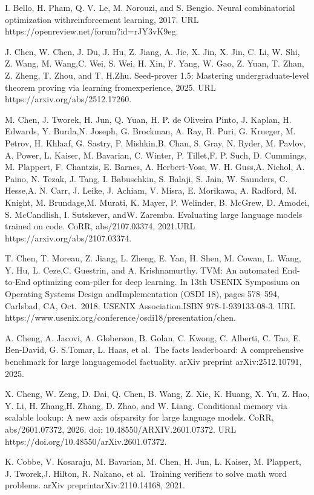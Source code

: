 \documentclass[
  10
]{article}
\begin{document}
I. Bello, H. Pham, Q. V. Le, M. Norouzi, and S. Bengio. Neural
combinatorial optimization withreinforcement learning, 2017. URL
https://openreview.net/forum?id=rJY3vK9eg.

J. Chen, W. Chen, J. Du, J. Hu, Z. Jiang, A. Jie, X. Jin, X. Jin, C. Li,
W. Shi, Z. Wang, M. Wang,C. Wei, S. Wei, H. Xin, F. Yang, W. Gao, Z.
Yuan, T. Zhan, Z. Zheng, T. Zhou, and T. H.Zhu. Seed-prover 1.5:
Mastering undergraduate-level theorem proving via learning
fromexperience, 2025. URL https://arxiv.org/abs/2512.17260.

M. Chen, J. Tworek, H. Jun, Q. Yuan, H. P. de Oliveira Pinto, J. Kaplan,
H. Edwards, Y. Burda,N. Joseph, G. Brockman, A. Ray, R. Puri, G.
Krueger, M. Petrov, H. Khlaaf, G. Sastry, P. Mishkin,B. Chan, S. Gray,
N. Ryder, M. Pavlov, A. Power, L. Kaiser, M. Bavarian, C. Winter, P.
Tillet,F. P. Such, D. Cummings, M. Plappert, F. Chantzis, E. Barnes, A.
Herbert-Voss, W. H. Guss,A. Nichol, A. Paino, N. Tezak, J. Tang, I.
Babuschkin, S. Balaji, S. Jain, W. Saunders, C. Hesse,A. N. Carr, J.
Leike, J. Achiam, V. Misra, E. Morikawa, A. Radford, M. Knight, M.
Brundage,M. Murati, K. Mayer, P. Welinder, B. McGrew, D. Amodei, S.
McCandlish, I. Sutskever, andW. Zaremba. Evaluating large language
models trained on code. CoRR, abs/2107.03374, 2021.URL
https://arxiv.org/abs/2107.03374.

T. Chen, T. Moreau, Z. Jiang, L. Zheng, E. Yan, H. Shen, M. Cowan, L.
Wang, Y. Hu, L. Ceze,C. Guestrin, and A. Krishnamurthy. TVM: An
automated End-to-End optimizing com-piler for deep learning. In 13th
USENIX Symposium on Operating Systems Design andImplementation (OSDI
18), pages 578--594, Carlsbad, CA, Oct.~2018. USENIX Association.ISBN
978-1-939133-08-3. URL
https://www.usenix.org/conference/osdi18/presentation/chen.

A. Cheng, A. Jacovi, A. Globerson, B. Golan, C. Kwong, C. Alberti, C.
Tao, E. Ben-David, G. S.Tomar, L. Haas, et al.~The facts leaderboard: A
comprehensive benchmark for large languagemodel factuality. arXiv
preprint arXiv:2512.10791, 2025.

X. Cheng, W. Zeng, D. Dai, Q. Chen, B. Wang, Z. Xie, K. Huang, X. Yu, Z.
Hao, Y. Li, H. Zhang,H. Zhang, D. Zhao, and W. Liang. Conditional memory
via scalable lookup: A new axis ofsparsity for large language models.
CoRR, abs/2601.07372, 2026. doi: 10.48550/ARXIV.2601.07372. URL
https://doi.org/10.48550/arXiv.2601.07372.

K. Cobbe, V. Kosaraju, M. Bavarian, M. Chen, H. Jun, L. Kaiser, M.
Plappert, J. Tworek,J. Hilton, R. Nakano, et al.~Training verifiers to
solve math word problems. arXiv preprintarXiv:2110.14168, 2021.
\end{document}
